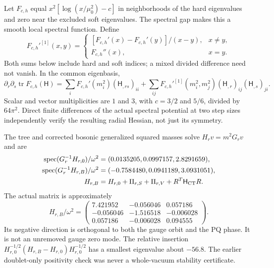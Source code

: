 \documentclass[11pt]{article}
\newcommand{\tr}{\operatorname{tr}}
\begin{document}
Let $F_{c,h}$ equal $x^2[\log(x/\mu_0^2)-c]$ in neighborhoods of the
hard eigenvalues and zero near the excluded soft eigenvalues. The
spectral gap makes this a smooth local spectral function. Define
\begin{equation}
 F_{c,h}'^{[1]}(x,y)=\begin{cases}
 [F_{c,h}'(x)-F_{c,h}'(y)]/(x-y),&x\ne y,\\
 F_{c,h}''(x),&x=y.
 \end{cases}
\end{equation}
Both sums below include hard and soft indices; a mixed divided
difference need not vanish. In the common eigenbasis,
\begin{equation}
 \partial_r\partial_s\tr F_{c,h}(\mathsf H)
 =\sum_i F_{c,h}'(m_i^2)(\mathsf H_{,rs})_{ii}
 +\sum_{ij}F_{c,h}'^{[1]}(m_i^2,m_j^2)
                   (\mathsf H_{,r})_{ij}(\mathsf H_{,s})_{ji}.
 \label{eq:frechet}
\end{equation}
Scalar and vector multiplicities are $1$ and $3$, with $c=3/2$ and
$5/6$, divided by $64\pi^2$. Direct finite differences of the actual
spectral potential at two step sizes independently verify the resulting
radial Hessian, not just its symmetry.

The tree and corrected bosonic generalized squared masses solve
$H_rv=m^2G_rv$ and are
\begin{align}
 \operatorname{spec}(G_r^{-1}H_{r,0})/\omega^2
   &=(0.0135205,0.0997157,2.8291659),\\
 \operatorname{spec}(G_r^{-1}H_{r,B})/\omega^2
   &=(-0.7584480,0.0941189,3.0931051),\label{eq:radialvalues}\\
 H_{r,B}&=H_{r,0}+\Pi_{r,S}+\Pi_{r,V}+R^T\mathsf H_{\rm CT}R.
\end{align}
The actual matrix is approximately
\begin{equation}
 H_{r,B}/\omega^2=
 \begin{pmatrix}
 7.421952&-0.056046&0.057186\\
 -0.056046&-1.516518&-0.006028\\
 0.057186&-0.006028&0.094555
 \end{pmatrix}.
 \label{eq:radialmatrix}
\end{equation}
Its negative direction is orthogonal to both the gauge orbit and the PQ
phase. It is not an unremoved gauge zero mode. The relative insertion
$H_{r,0}^{-1/2}(H_{r,B}-H_{r,0})H_{r,0}^{-1/2}$ has a smallest eigenvalue
about $-56.8$. The earlier doublet-only positivity check was never a
whole-vacuum stability certificate.
\end{document}
